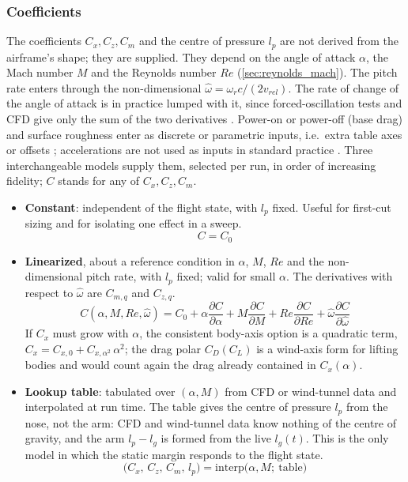 \subsubsection{Coefficients}\label{sec:aero_coeffs}
The coefficients $C_x,C_z,C_m$ and the centre of pressure $l_p$ are not derived from the airframe's
shape; they are supplied. They depend on the angle of attack $\alpha$, the Mach number $M$ and the
Reynolds number $Re$ (\autoref{sec:reynolds_mach}).
The pitch rate enters through the non-dimensional $\hat{\omega}=\omega_rc/(2v_{rel})$. The rate of
change of the angle of attack is in practice lumped with it, since forced-oscillation tests and CFD
give only the sum of the two derivatives \cite{cobalt}. Power-on or power-off (base drag) and surface
roughness enter as discrete or parametric inputs, i.e.\ extra table axes or offsets
\cite{rasaerom}; accelerations are not used as inputs in standard practice
\cite{datcom,rasaerom}.
Three interchangeable models supply them, selected per run, in order of increasing fidelity; $C$
stands for any of $C_x,C_z,C_m$.
\begin{itemize}
    \item \textbf{Constant}: independent of the flight state, with $l_p$ fixed. Useful for
    first-cut sizing and for isolating one effect in a sweep.
    \begin{equation}
        C = C_0
    \end{equation}
    \item \textbf{Linearized}, about a reference condition in $\alpha$, $M$, $Re$ and the
    non-dimensional pitch rate, with $l_p$ fixed; valid for small $\alpha$. The derivatives with
    respect to $\hat{\omega}$ are $C_{m,q}$ and $C_{z,q}$.
    \begin{equation} \label{eq:aero_general_linear}
        C(\alpha,M,Re,\hat{\omega}) = C_0 + \alpha\frac{\partial C}{\partial\alpha}
            + M\frac{\partial C}{\partial M} + Re\frac{\partial C}{\partial Re}
            + \hat{\omega}\frac{\partial C}{\partial\hat{\omega}}
    \end{equation}
    If $C_x$ must grow with $\alpha$, the consistent body-axis option is a quadratic term,
    $C_x=C_{x,0}+C_{x,\alpha^2}\,\alpha^2$; the drag polar $C_D(C_L)$ is a wind-axis form for
    lifting bodies and would count again the drag already contained in $C_x(\alpha)$.
    \item \textbf{Lookup table}: tabulated over $(\alpha,M)$ from CFD or wind-tunnel data and
    interpolated at run time. The table gives the centre of pressure $l_p$ from the nose, not the
    arm: CFD and wind-tunnel data know nothing of the centre of gravity, and the arm $l_p-l_g$ is
    formed from the live $l_g(t)$. This is the only model in which the static margin responds to
    the flight state.
    \begin{equation}
        \bigl(C_x,\,C_z,\,C_m,\,l_p\bigr) = \mathrm{interp}\bigl(\alpha,M;\ \text{table}\bigr)
    \end{equation}
\end{itemize}
